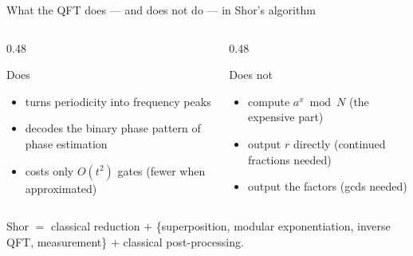 \documentclass[aspectratio=169,11pt]{beamer}
\begin{document}
\begin{frame}[label=fQFTRole]{What the QFT does --- and does not do --- in Shor's algorithm}
  \small
  \begin{columns}[T]
    \begin{column}{0.48\textwidth}
      \begin{block}{Does}
        \begin{itemize}\itemsep1pt
          \item turns periodicity into frequency peaks
          \item decodes the binary phase pattern of phase estimation
          \item costs only $O(t^2)$ gates (fewer when approximated)
        \end{itemize}
      \end{block}
    \end{column}
    \begin{column}{0.48\textwidth}
      \begin{alertblock}{Does not}
        \begin{itemize}\itemsep1pt
          \item compute $a^x \bmod N$ (the expensive part)
          \item output $r$ directly (continued fractions needed)
          \item output the factors (gcds needed)
        \end{itemize}
      \end{alertblock}
    \end{column}
  \end{columns}
  \vspace{4pt}
  \centering\color{qgrey} Shor $=$ classical reduction $+$ \{superposition, modular exponentiation, inverse QFT, measurement\} $+$ classical post-processing.
\end{frame}

\end{document}

